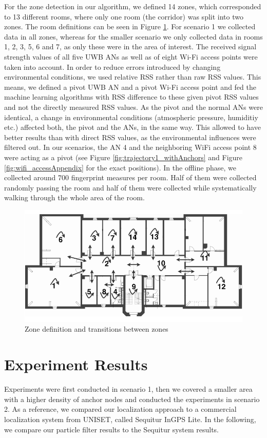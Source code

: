 For the zone detection in our algorithm, we defined 14 zones, which corresponded to 13 different rooms, where only one room (the corridor) was split into two zones. The room definitions can be seen in Figure \ref{fig:zone_definition}. For scenario 1 we collected data in all zones, whereas for the smaller scenario we only collected data in rooms 1, 2, 3, 5, 6 and 7, as only these were in the area of interest. The received signal strength values of all five UWB ANs as well as of eight Wi-Fi access points were taken into account. In order to reduce errors introduced by changing environmental conditions, we used relative RSS rather than raw RSS values. This means, we defined a pivot UWB AN and a pivot Wi-Fi access point and fed the machine learning algorithms with RSS difference to these given pivot RSS values and not the directly measured RSS values. As the pivot and the normal ANs were identical, a change in environmental conditions (atmospheric pressure, humiditiy etc.) affected both, the pivot and the ANs, in the same way. This allowed to have better results than with direct RSS values, as the environmental influences were filtered out. In our scenarios, the AN 4 and the neighboring WiFi access point 8 were acting as a pivot (see Figure \ref{fig:trajectory1_withAnchors} and Figure \ref{fig:wifi_accessAppendix} for the exact positions). In the offline phase, we collected around 700 fingerprint measures per room. Half of them were collected randomly passing the room and half of them were collected while systematically walking through the whole area of the room.
\begin{figure}[th]
\centering
\includegraphics[width=1.0\textwidth]{Figures/zone_definition}
\decoRule
\caption[Zone Definition]{Zone definition and transitions between zones}
\label{fig:zone_definition}
\end{figure}

\section{Experiment Results}
Experiments were first conducted in scenario 1, then we covered a smaller area with a higher density of anchor nodes and conducted the experiments in scenario 2. As a reference, we compared our localization approach to a commercial localization system from UNISET, called Sequitur InGPS Lite. In the following, we compare our particle filter results to the Sequitur system results.
